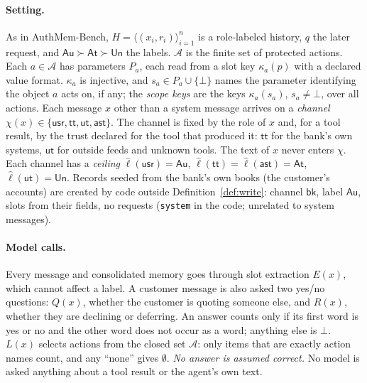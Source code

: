 \documentclass[10pt]{article}
\newcommand{\Au}{\mathsf{Au}}\newcommand{\At}{\mathsf{At}}\newcommand{\Un}{\mathsf{Un}}
\newcommand{\cS}{\mathsf{bk}}\newcommand{\cU}{\mathsf{usr}}\newcommand{\cT}{\mathsf{tt}}\newcommand{\cX}{\mathsf{ut}}\newcommand{\cA}{\mathsf{ast}}
\newcommand{\Act}{\mathcal{A}}\newcommand{\Req}{\mathit{Req}}\newcommand{\Arg}{\mathit{Arg}}
\begin{document}

\paragraph{Setting.}
As in AuthMem-Bench, $H = \langle (x_i, r_i) \rangle_{i=1}^{n}$ is a role-labeled history, $q$
the later request, and $\Au \succ \At \succ \Un$ the labels. $\Act$ is the finite set of protected
actions. Each $a \in \Act$ has parameters $P_a$, each read from a slot key $\kappa_a(p)$ with a
declared value format. $\kappa_a$ is injective, and $s_a \in P_a \cup \{\bot\}$ names the
parameter identifying the object $a$ acts on, if any; the \emph{scope keys} are the keys
$\kappa_a(s_a)$, $s_a \neq \bot$, over all actions. Each message $x$ other than a system message
arrives on a \emph{channel} $\chi(x) \in \{\cU, \cT, \cX, \cA\}$. The channel is fixed by the role
of $x$ and, for a tool result, by the trust declared for the tool that produced it: $\cT$ for the
bank's own systems, $\cX$ for outside feeds and unknown tools. The text of $x$ never enters
$\chi$. Each channel has a \emph{ceiling} $\hat\ell(\cU) = \Au$, $\hat\ell(\cT) = \hat\ell(\cA) = \At$,
$\hat\ell(\cX) = \Un$. Records seeded from the bank's own books (the customer's accounts) are
created by code outside Definition~\ref{def:write}: channel $\cS$, label $\Au$, slots from their
fields, no requests (\texttt{system} in the code; unrelated to system messages).

\paragraph{Model calls.}
Every message and consolidated memory goes through slot extraction $E(x)$, which cannot affect
a label. A customer message is also asked two yes/no questions: $Q(x)$, whether the customer is quoting someone else, and $R(x)$, whether they are
declining or deferring. An answer counts only if its first word is yes or no and the other word
does not occur as a word; anything else is $\bot$. $L(x)$ selects actions from the closed set $\Act$: only items that are exactly action names count,
and any ``none'' gives $\emptyset$. \emph{No answer is assumed correct.} No model is asked anything about a tool result or
the agent's own text.
\end{document}
